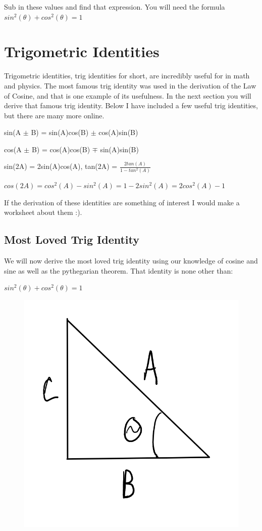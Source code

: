 \documentclass[12pt]{article}
\begin{document}
Sub in these values and find that expression. You will need the formula $sin^2(\theta) + cos^2(\theta) = 1$

\parbox[][8cm][t]{8cm}{}

\section{Trigometric Identities}

Trigometric identities, trig identities for short, are incredibly useful for in math and physics. The most famous trig identity was used in the derivation of the Law of Cosine, and that is one example of its usefulness. In the next section you will derive that famous trig identity. Below I have included a few useful trig identities, but there are many more online.

sin(A $\pm$ B) = sin(A)cos(B) $\pm$ cos(A)sin(B)

cos(A $\pm$ B) = cos(A)cos(B) $\mp$ sin(A)sin(B)

sin(2A) = 2sin(A)cos(A), tan(2A) = $\frac{2tan(A)}{1 - tan^2(A)}$

$cos(2A) = cos^2(A) - sin^2(A) = 1 - 2sin^2(A) = 2cos^2(A) - 1$

If the derivation of these identities are something of interest I would make a worksheet about them :).

\subsection{Most Loved Trig Identity}

We will now derive the most loved trig identity using our knowledge of cosine and sine as well as the pythegarian theorem. That identity is none other than:

$sin^2(\theta) + cos^2(\theta) = 1$

\begin{figure}[h]
\includegraphics[scale=0.25]{TrigFirstDerivation.png}
\end{figure}
\end{document}
